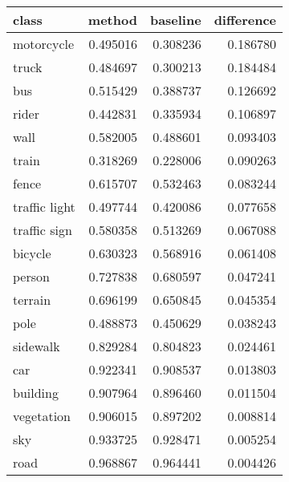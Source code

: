 \begin{tabular}{lrrr}
\toprule
class & method & baseline & difference \\
\midrule
motorcycle & 0.495016 & 0.308236 & 0.186780 \\
truck & 0.484697 & 0.300213 & 0.184484 \\
bus & 0.515429 & 0.388737 & 0.126692 \\
rider & 0.442831 & 0.335934 & 0.106897 \\
wall & 0.582005 & 0.488601 & 0.093403 \\
train & 0.318269 & 0.228006 & 0.090263 \\
fence & 0.615707 & 0.532463 & 0.083244 \\
traffic light & 0.497744 & 0.420086 & 0.077658 \\
traffic sign & 0.580358 & 0.513269 & 0.067088 \\
bicycle & 0.630323 & 0.568916 & 0.061408 \\
person & 0.727838 & 0.680597 & 0.047241 \\
terrain & 0.696199 & 0.650845 & 0.045354 \\
pole & 0.488873 & 0.450629 & 0.038243 \\
sidewalk & 0.829284 & 0.804823 & 0.024461 \\
car & 0.922341 & 0.908537 & 0.013803 \\
building & 0.907964 & 0.896460 & 0.011504 \\
vegetation & 0.906015 & 0.897202 & 0.008814 \\
sky & 0.933725 & 0.928471 & 0.005254 \\
road & 0.968867 & 0.964441 & 0.004426 \\
\bottomrule
\end{tabular}
